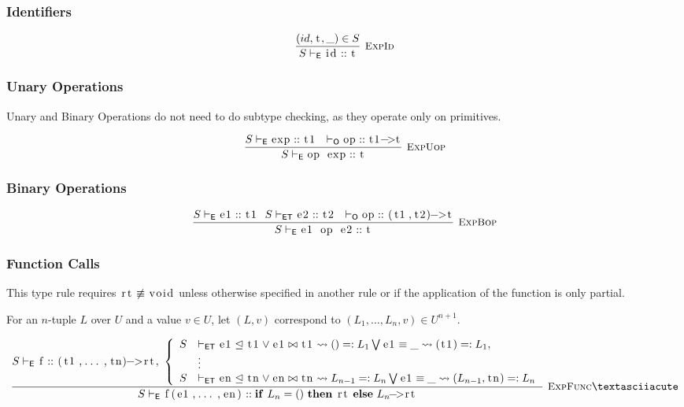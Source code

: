 \documentclass{article}
\newcommand{\code}[1]{\lstinline[columns=fixed]{#1}}
\newcommand{\drmrule}[5]{\frac{#1}{#2\vdash_{\mathsf{#3}}#4}\textsc{\ \small{#5}}}
\newcommand{\ruleapp}[1]{\vdash_{\mathsf{#1}}}
\newcommand{\mc}[1]{\textnormal{\code{#1}}}
\begin{document}
			\subsubsection{Identifiers}
			
				\begin{align*}
					\drmrule{(id,\mc{t},\_)\in S}{S}{E}{\mc{id} :: \mc{t}}{ExpId}
				\end{align*}
			
			\subsubsection{Unary Operations}
			
				Unary and Binary Operations do not need to do subtype checking, as they operate only on primitives.
			
				\begin{align*}
					\drmrule{S\ruleapp{E}\mc{exp}::\mc{t1}\ \ \ruleapp{O}\mc{op}::\mc{t1->t}}{S}{E}{\mc{op exp}::\mc{t}}{ExpUop}
				\end{align*}
			
			\subsubsection{Binary Operations}
			
				\begin{align*}
					\drmrule{S\ruleapp{E}\mc{e1}::\mc{t1}\ \ S\ruleapp{ET}\mc{e2}::\mc{t2}\ \ \ruleapp{O}\mc{op}::\mc{(t1,t2)->t}}{S}{E}{\mc{e1 op e2} :: \mc{t}}{ExpBop}
				\end{align*}
			
			\subsubsection{Function Calls}
			
				This type rule requires $\mc{rt}\not\equiv\mc{void}$ unless otherwise specified in another rule or if the application of the function is only partial.
				
				For an $n$-tuple $L$ over $U$ and a value $v\in U$, let $(L,v)$ correspond to $(L_1,\dots,L_n,v)\in U^{n+1}$.
			
				\begin{align*}
					\drmrule{S\ruleapp{E}\mc{f}::\mc{(t1,...,tn)->rt},\ \left\{ 
						\begin{array}{rl}
							S&\ruleapp{ET}\mc{e1}\trianglelefteq\mc{t1}\vee\mc{e1}\bowtie\mc{t1} \leadsto ()=:L_1 \bigvee
								\mc{e1} \equiv \_ \leadsto (\mc{t1})=:L_1,\\
							&\vdots\\
							S&\ruleapp{ET}\mc{en}\trianglelefteq\mc{tn}\vee\mc{en}\bowtie\mc{tn} \leadsto L_{n-1}=:L_n \bigvee
								\mc{e1} \equiv \_ \leadsto (L_{n-1},\mc{tn})=:L_n
						\end{array}\right.}{S}{E}{\mc{f(e1,...,en)}:: \mathbf{if}\ L_n=()\ \mathbf{then}\ \mc{rt} \ \mathbf{else}\ L_n\mc{->rt}}{ExpFunc}´
				\end{align*}
				
\end{document}
